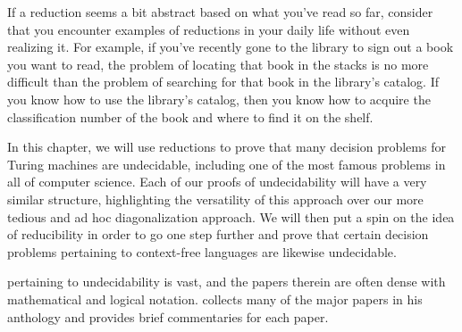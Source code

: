 If a reduction seems a bit abstract based on what you've read so far, consider that you encounter examples of reductions in your daily life without even realizing it. For example, if you've recently gone to the library to sign out a book you want to read, the problem of locating that book in the stacks is no more difficult than the problem of searching for that book in the library's catalog. If you know how to use the library's catalog, then you know how to acquire the classification number of the book and where to find it on the shelf.

In this chapter, we will use reductions to prove that many decision problems for Turing machines are undecidable, including one of the most famous problems in all of computer science. Each of our proofs of undecidability will have a very similar structure, highlighting the versatility of this approach over our more tedious and ad hoc diagonalization approach. We will then put a spin on the idea of reducibility in order to go one step further and prove that certain decision problems pertaining to context-free languages are likewise undecidable.










 pertaining to undecidability is vast, and the papers therein are often dense with mathematical and logical notation. \citet{Davis1965TheUndecidable} collects many of the major papers in his anthology and provides brief commentaries for each paper.

